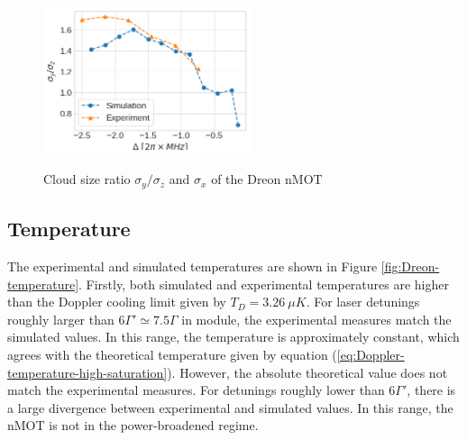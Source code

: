 \begin{figure}[!ht]
    \centering
    \caption{Cloud size ratio $ \sigma_y / \sigma_z $ and $ \sigma_x $ of the Dreon nMOT}
    \includegraphics[width=0.55\textwidth]{USPSC-img/dy_cloud_size_ratio.png}
    \vspace{5px}
    \label{fig:Dreon-cloud-size-ratio}
\end{figure}

\subsection{Temperature}
\label{temperature}

The experimental and simulated temperatures are shown in Figure \ref{fig:Dreon-temperature}. Firstly, both simulated and experimental temperatures are higher than the Doppler cooling limit given by $ T_D = 3.26\ \mu K $. For laser detunings roughly larger than $ 6 \Gamma' \simeq 7.5 \Gamma $ in module, the experimental measures match the simulated values. In this range, the temperature is approximately constant, which agrees with the theoretical temperature given by equation (\ref{eq:Doppler-temperature-high-saturation}). However, the absolute theoretical value does not match the experimental measures. For detunings roughly lower than $ 6 \Gamma' $, there is a large divergence between experimental and simulated values. In this range, the nMOT is not in the power-broadened regime.

